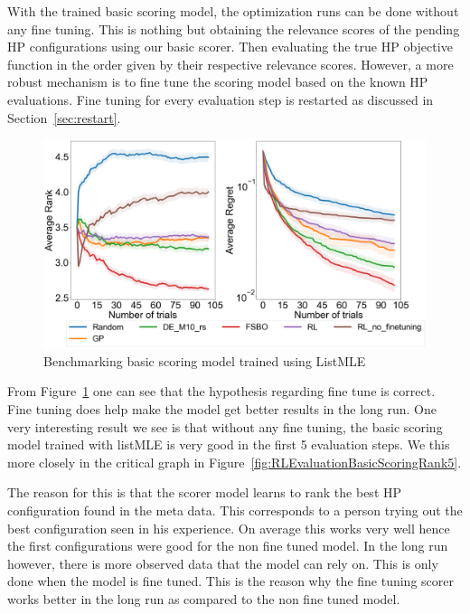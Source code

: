 \documentclass[12pt, twoside, ngerman]{report}
\begin{document}
With the trained basic scoring model,  the optimization runs can be done without any fine tuning.
This is nothing but obtaining the relevance scores of the pending HP configurations using our basic scorer.
Then evaluating the true HP objective function in the order given by their respective relevance scores.
However,  a more robust mechanism is to fine tune the scoring model based on the known HP evaluations.
Fine tuning for every evaluation step is restarted as discussed in Section~\ref{sec:restart}.

\begin{figure}[h]
  \centering
    \includegraphics[scale=0.25]{images/RLEvaluationBasicScoring}
    \caption{Benchmarking basic scoring model trained using ListMLE}
    \label{fig:RLEvaluationBasicScoring}
\end{figure}

From Figure~\ref{fig:RLEvaluationBasicScoring} one can see that the hypothesis regarding fine tune is correct.
Fine tuning does help make the model get better results in the long run.
One very interesting result we see is that without any fine tuning,  the basic scoring model trained with listMLE is very good in the first 5 evaluation steps.
We this more closely in the critical graph in Figure~\ref{fig:RLEvaluationBasicScoringRank5}.

The reason for this is that the scorer model learns to rank the best HP configuration found in the meta data.
This corresponds to a person trying out the best configuration seen in his experience.
On average this works very well hence the first configurations were good for the non fine tuned model.
In the long run however,  there is more observed data that the model can rely on.
This is only done when the model is fine tuned.
This is the reason why the fine tuning scorer works better in the long run as compared to the non fine tuned model.
\end{document}
